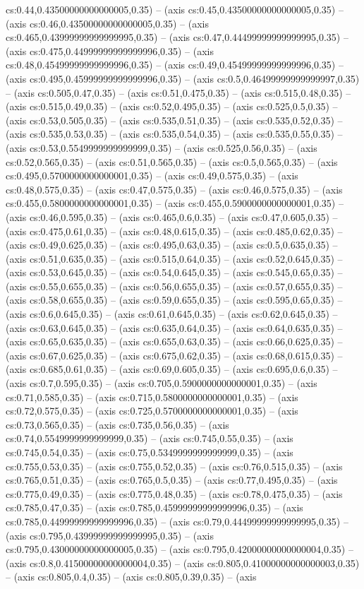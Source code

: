 cs:0.44,0.43500000000000005,0.35) -- (axis cs:0.45,0.43500000000000005,0.35) -- (axis cs:0.46,0.43500000000000005,0.35) -- (axis cs:0.465,0.43999999999999995,0.35) -- (axis cs:0.47,0.44499999999999995,0.35) -- (axis cs:0.475,0.44999999999999996,0.35) -- (axis cs:0.48,0.45499999999999996,0.35) -- (axis cs:0.49,0.45499999999999996,0.35) -- (axis cs:0.495,0.45999999999999996,0.35) -- (axis cs:0.5,0.46499999999999997,0.35) -- (axis cs:0.505,0.47,0.35) -- (axis cs:0.51,0.475,0.35) -- (axis cs:0.515,0.48,0.35) -- (axis cs:0.515,0.49,0.35) -- (axis cs:0.52,0.495,0.35) -- (axis cs:0.525,0.5,0.35) -- (axis cs:0.53,0.505,0.35) -- (axis cs:0.535,0.51,0.35) -- (axis cs:0.535,0.52,0.35) -- (axis cs:0.535,0.53,0.35) -- (axis cs:0.535,0.54,0.35) -- (axis cs:0.535,0.55,0.35) -- (axis cs:0.53,0.5549999999999999,0.35) -- (axis cs:0.525,0.56,0.35) -- (axis cs:0.52,0.565,0.35) -- (axis cs:0.51,0.565,0.35) -- (axis cs:0.5,0.565,0.35) -- (axis cs:0.495,0.5700000000000001,0.35) -- (axis cs:0.49,0.575,0.35) -- (axis cs:0.48,0.575,0.35) -- (axis cs:0.47,0.575,0.35) -- (axis cs:0.46,0.575,0.35) -- (axis cs:0.455,0.5800000000000001,0.35) -- (axis cs:0.455,0.5900000000000001,0.35) -- (axis cs:0.46,0.595,0.35) -- (axis cs:0.465,0.6,0.35) -- (axis cs:0.47,0.605,0.35) -- (axis cs:0.475,0.61,0.35) -- (axis cs:0.48,0.615,0.35) -- (axis cs:0.485,0.62,0.35) -- (axis cs:0.49,0.625,0.35) -- (axis cs:0.495,0.63,0.35) -- (axis cs:0.5,0.635,0.35) -- (axis cs:0.51,0.635,0.35) -- (axis cs:0.515,0.64,0.35) -- (axis cs:0.52,0.645,0.35) -- (axis cs:0.53,0.645,0.35) -- (axis cs:0.54,0.645,0.35) -- (axis cs:0.545,0.65,0.35) -- (axis cs:0.55,0.655,0.35) -- (axis cs:0.56,0.655,0.35) -- (axis cs:0.57,0.655,0.35) -- (axis cs:0.58,0.655,0.35) -- (axis cs:0.59,0.655,0.35) -- (axis cs:0.595,0.65,0.35) -- (axis cs:0.6,0.645,0.35) -- (axis cs:0.61,0.645,0.35) -- (axis cs:0.62,0.645,0.35) -- (axis cs:0.63,0.645,0.35) -- (axis cs:0.635,0.64,0.35) -- (axis cs:0.64,0.635,0.35) -- (axis cs:0.65,0.635,0.35) -- (axis cs:0.655,0.63,0.35) -- (axis cs:0.66,0.625,0.35) -- (axis cs:0.67,0.625,0.35) -- (axis cs:0.675,0.62,0.35) -- (axis cs:0.68,0.615,0.35) -- (axis cs:0.685,0.61,0.35) -- (axis cs:0.69,0.605,0.35) -- (axis cs:0.695,0.6,0.35) -- (axis cs:0.7,0.595,0.35) -- (axis cs:0.705,0.5900000000000001,0.35) -- (axis cs:0.71,0.585,0.35) -- (axis cs:0.715,0.5800000000000001,0.35) -- (axis cs:0.72,0.575,0.35) -- (axis cs:0.725,0.5700000000000001,0.35) -- (axis cs:0.73,0.565,0.35) -- (axis cs:0.735,0.56,0.35) -- (axis cs:0.74,0.5549999999999999,0.35) -- (axis cs:0.745,0.55,0.35) -- (axis cs:0.745,0.54,0.35) -- (axis cs:0.75,0.5349999999999999,0.35) -- (axis cs:0.755,0.53,0.35) -- (axis cs:0.755,0.52,0.35) -- (axis cs:0.76,0.515,0.35) -- (axis cs:0.765,0.51,0.35) -- (axis cs:0.765,0.5,0.35) -- (axis cs:0.77,0.495,0.35) -- (axis cs:0.775,0.49,0.35) -- (axis cs:0.775,0.48,0.35) -- (axis cs:0.78,0.475,0.35) -- (axis cs:0.785,0.47,0.35) -- (axis cs:0.785,0.45999999999999996,0.35) -- (axis cs:0.785,0.44999999999999996,0.35) -- (axis cs:0.79,0.44499999999999995,0.35) -- (axis cs:0.795,0.43999999999999995,0.35) -- (axis cs:0.795,0.43000000000000005,0.35) -- (axis cs:0.795,0.42000000000000004,0.35) -- (axis cs:0.8,0.41500000000000004,0.35) -- (axis cs:0.805,0.41000000000000003,0.35) -- (axis cs:0.805,0.4,0.35) -- (axis cs:0.805,0.39,0.35) -- (axis 